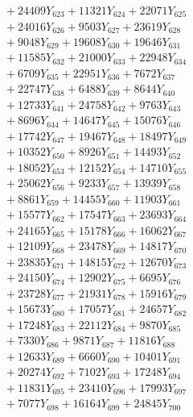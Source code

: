 \documentclass[a4paper,10pt]{article}
\begin{document}
{\begin{align}
&\;  + 24409 Y_{623} + 11321 Y_{624} + 22071 Y_{625} \\[0.3ex]
&\;  + 24016 Y_{626} + 9503 Y_{627} + 23619 Y_{628} \\[0.5ex]\allowbreak
&\;  + 9048 Y_{629} + 19608 Y_{630} + 19646 Y_{631} \\[0.3ex]
&\;  + 11585 Y_{632} + 21000 Y_{633} + 22948 Y_{634} \\[0.3ex]
&\;  + 6709 Y_{635} + 22951 Y_{636} + 7672 Y_{637} \\[0.3ex]
&\;  + 22747 Y_{638} + 6488 Y_{639} + 8644 Y_{640} \\[0.3ex]
&\;  + 12733 Y_{641} + 24758 Y_{642} + 9763 Y_{643} \\[0.3ex]
&\;  + 8696 Y_{644} + 14647 Y_{645} + 15076 Y_{646} \\[0.3ex]
&\;  + 17742 Y_{647} + 19467 Y_{648} + 18497 Y_{649} \\[0.3ex]
&\;  + 10352 Y_{650} + 8926 Y_{651} + 14493 Y_{652} \\[0.3ex]
&\;  + 18052 Y_{653} + 12152 Y_{654} + 14710 Y_{655} \\[0.3ex]
&\;  + 25062 Y_{656} + 9233 Y_{657} + 13939 Y_{658} \\[0.5ex]\allowbreak
&\;  + 8861 Y_{659} + 14455 Y_{660} + 11903 Y_{661} \\[0.3ex]
&\;  + 15577 Y_{662} + 17547 Y_{663} + 23693 Y_{664} \\[0.3ex]
&\;  + 24165 Y_{665} + 15178 Y_{666} + 16062 Y_{667} \\[0.3ex]
&\;  + 12109 Y_{668} + 23478 Y_{669} + 14817 Y_{670} \\[0.3ex]
&\;  + 23835 Y_{671} + 14815 Y_{672} + 12670 Y_{673} \\[0.3ex]
&\;  + 24150 Y_{674} + 12902 Y_{675} + 6695 Y_{676} \\[0.3ex]
&\;  + 23728 Y_{677} + 21931 Y_{678} + 15916 Y_{679} \\[0.3ex]
&\;  + 15673 Y_{680} + 17057 Y_{681} + 24657 Y_{682} \\[0.3ex]
&\;  + 17248 Y_{683} + 22112 Y_{684} + 9870 Y_{685} \\[0.3ex]
&\;  + 7330 Y_{686} + 9871 Y_{687} + 11816 Y_{688} \\[0.5ex]\allowbreak
&\;  + 12633 Y_{689} + 6660 Y_{690} + 10401 Y_{691} \\[0.3ex]
&\;  + 20274 Y_{692} + 7102 Y_{693} + 17248 Y_{694} \\[0.3ex]
&\;  + 11831 Y_{695} + 23410 Y_{696} + 17993 Y_{697} \\[0.3ex]
&\;  + 7077 Y_{698} + 16164 Y_{699} + 24845 Y_{700} \\[0.3ex]

\end{align}}
\end{document}
